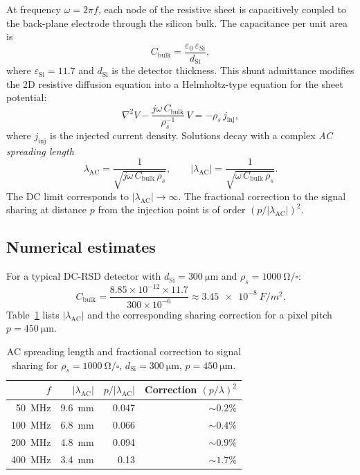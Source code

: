 \documentclass[preprint,numbers,1p]{elsarticle}
\begin{document}
At frequency $\omega = 2\pi f$, each node of the resistive sheet is capacitively
coupled to the back-plane electrode through the silicon bulk. The capacitance per unit area is
\begin{equation}
  C_\mathrm{bulk} = \frac{\varepsilon_0\,\varepsilon_\mathrm{Si}}{d_\mathrm{Si}},
\end{equation}
where $\varepsilon_\mathrm{Si} = 11.7$ and $d_\mathrm{Si}$ is the detector thickness.
This shunt admittance modifies the 2D resistive diffusion equation into a
Helmholtz-type equation for the sheet potential:
\begin{equation}
  \nabla^2 V - \frac{j\omega\,C_\mathrm{bulk}}{\rho_s^{-1}}\,V = -\rho_s\,j_\mathrm{inj},
\end{equation}
where $j_\mathrm{inj}$ is the injected current density.
Solutions decay with a complex \emph{AC spreading length}
\begin{equation}
  \lambda_\mathrm{AC} = \frac{1}{\sqrt{j\omega\,C_\mathrm{bulk}\,\rho_s}},
  \qquad
  |\lambda_\mathrm{AC}| = \frac{1}{\sqrt{\omega\,C_\mathrm{bulk}\,\rho_s}}.
\end{equation}
The DC limit corresponds to $|\lambda_\mathrm{AC}| \to \infty$. The fractional correction
to the signal sharing at distance $p$ from the injection point is of order
$(p/|\lambda_\mathrm{AC}|)^2$.

\subsection{Numerical estimates}
\label{sec:quasistatic_numbers}

For a typical DC-RSD detector with $d_\mathrm{Si} = \SI{300}{\micro\meter}$ and
$\rho_s = \SI{1000}{\ohm/\square}$:
\begin{equation}
  C_\mathrm{bulk} = \frac{8.85\times10^{-12}\times 11.7}{300\times10^{-6}}
  \approx \SI{3.45e-8}{F/m^2}.
\end{equation}
Table~\ref{tab:lambda} lists $|\lambda_\mathrm{AC}|$ and the corresponding sharing
correction for a pixel pitch $p = \SI{450}{\micro\meter}$.

\begin{table}[h]
\centering
\caption{AC spreading length and fractional correction to signal sharing
  for $\rho_s = \SI{1000}{\ohm/\square}$, $d_\mathrm{Si} = \SI{300}{\micro\meter}$,
  $p = \SI{450}{\micro\meter}$.}
\label{tab:lambda}
\begin{tabular}{rrrr}
\toprule
$f$ & $|\lambda_\mathrm{AC}|$ & $p/|\lambda_\mathrm{AC}|$ & Correction $(p/\lambda)^2$ \\
\midrule
\SI{50}{MHz}  & \SI{9.6}{mm}  & 0.047 & $\sim 0.2\%$ \\
\SI{100}{MHz} & \SI{6.8}{mm}  & 0.066 & $\sim 0.4\%$ \\
\SI{200}{MHz} & \SI{4.8}{mm}  & 0.094 & $\sim 0.9\%$ \\
\SI{400}{MHz} & \SI{3.4}{mm}  & 0.13  & $\sim 1.7\%$ \\
\bottomrule
\end{tabular}
\end{table}
\end{document}
